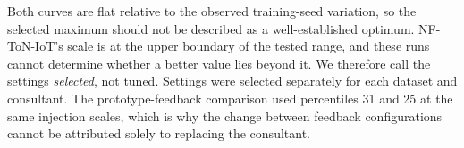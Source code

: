 Both curves are flat relative to the observed training-seed variation, so the selected maximum should not be described as a well-established optimum. NF-ToN-IoT's scale is at the upper boundary of the tested range, and these runs cannot determine whether a better value lies beyond it. We therefore call the settings \emph{selected}, not tuned. Settings were selected separately for each dataset and consultant. The prototype-feedback comparison used percentiles 31 and 25 at the same injection scales, which is why the change between feedback configurations cannot be attributed solely to replacing the consultant.
